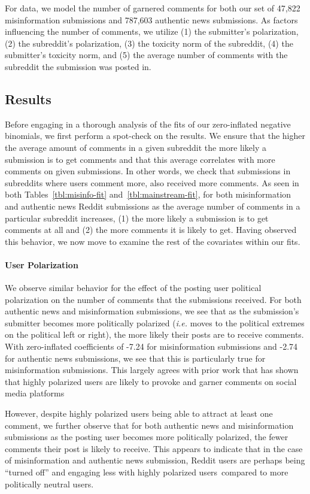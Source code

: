 For data, we model the number of garnered comments for both our set of 47,822 misinformation submissions and 787,603 authentic news submissions. As factors influencing the number of comments, we utilize (1) the submitter's polarization, (2) the subreddit's polarization, (3) the toxicity norm of the subreddit, (4) the submitter's toxicity norm, and (5) the average number of comments with the subreddit the submission was posted in. 


\subsection{Results}  Before engaging in a thorough analysis of the fits of our zero-inflated negative binomials, we first perform a spot-check on the results. We ensure that the higher the average amount of comments in a given subreddit the more likely a submission is to get comments and that this average correlates with more comments on given submissions. In other words, we check that submissions in subreddits where users comment more, also received more comments. As seen in both Tables~\ref{tbl:misinfo-fit} and~\ref{tbl:mainstream-fit}, for both misinformation and authentic news Reddit submissions as the average number of comments in a particular subreddit increases, (1) the more likely a submission is to get comments at all and (2) the more comments it is likely to get. Having observed this behavior, we now move to examine the rest of the covariates within our fits. 

\paragraph{User Polarization} We observe similar behavior for the effect of the posting user political polarization on the number of comments that the submissions received. For both authentic news and misinformation submissions, we see that as the submission's submitter becomes more politically polarized (\textit{i.e.} moves to the political extremes on the political left or right), the more likely their posts are to receive comments. With zero-inflated coefficients of -7.24 for misinformation submissions and -2.74 for authentic news submissions, we see that this is particularly true for misinformation submissions. This largely agrees with prior work that has shown that highly polarized users are likely to provoke and garner comments on social media platforms~\cite{kim2021distorting,howard2019ira}

However, despite highly polarized users being able to attract at least one comment, we further observe that for both authentic news and misinformation submissions as the posting user becomes more politically polarized, the fewer comments their post is likely to receive. This appears to indicate that in the case of misinformation and authentic news submission, Reddit users are perhaps being ``turned off'' and engaging less with highly polarized users~\cite{hetherington2008turned}compared to more politically neutral users.

